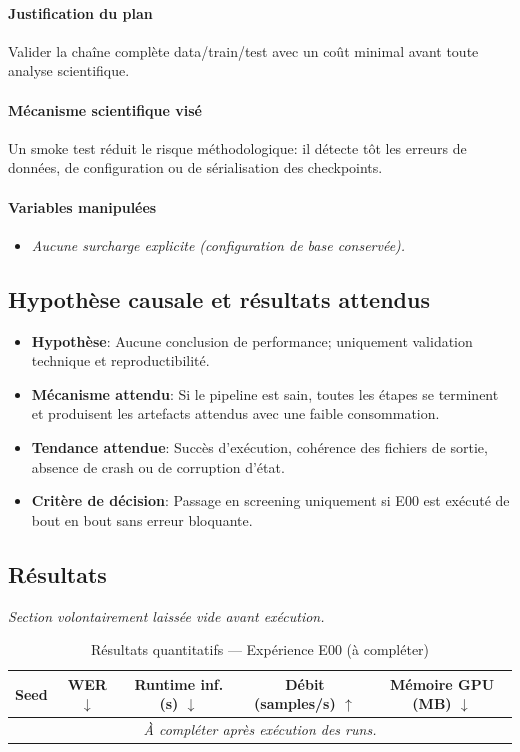 \documentclass[11pt,a4paper]{article}
\begin{document}
\paragraph{Justification du plan}
Valider la chaîne complète data/train/test avec un coût minimal avant toute analyse scientifique.

\paragraph{Mécanisme scientifique visé}
Un smoke test réduit le risque méthodologique: il détecte tôt les erreurs de données, de configuration ou de sérialisation des checkpoints.

\paragraph{Variables manipulées}
\begin{itemize}
\item \textit{Aucune surcharge explicite (configuration de base conservée).}
\end{itemize}

\subsection{Hypothèse causale et résultats attendus}
\begin{itemize}[leftmargin=1.2cm]
\item \textbf{Hypothèse}: Aucune conclusion de performance; uniquement validation technique et reproductibilité.
\item \textbf{Mécanisme attendu}: Si le pipeline est sain, toutes les étapes se terminent et produisent les artefacts attendus avec une faible consommation.
\item \textbf{Tendance attendue}: Succès d'exécution, cohérence des fichiers de sortie, absence de crash ou de corruption d'état.
\item \textbf{Critère de décision}: Passage en screening uniquement si E00 est exécuté de bout en bout sans erreur bloquante.
\end{itemize}

\subsection{Résultats}
\textit{Section volontairement laissée vide avant exécution.}

\begin{table}[H]
\centering
\caption{Résultats quantitatifs --- Expérience E00 (à compléter)}
\begin{tabular}{lcccc}
\toprule
Seed & WER $\downarrow$ & Runtime inf. (s) $\downarrow$ & Débit (samples/s) $\uparrow$ & Mémoire GPU (MB) $\downarrow$ \\
\midrule
\multicolumn{5}{c}{\textit{À compléter après exécution des runs.}} \\
\bottomrule
\end{tabular}
\end{table}
\end{document}
